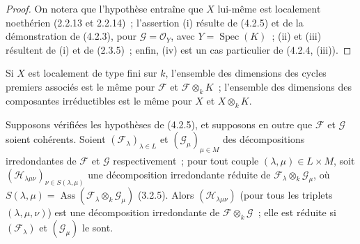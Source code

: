 \begin{proof}
On notera que l'hypothèse entraîne que $X$ lui-même est localement noethérien
(2.2.13 et 2.2.14)~; l'assertion (i) résulte de (4.2.5) et de la démonstration
de (4.2.3), pour $\mathcal G=\mathcal O_Y$, avec
$Y=\operatorname{Spec}(K)$~; (ii) et (iii) résultent de (i) et de (2.3.5)~;
enfin, (iv) est un cas particulier de (4.2.4, (iii)).
\end{proof}

\begin{corollary}[4.2.8]
\label{IV.2.4.2.8-fr}
Si $X$ est localement de type fini sur $k$, l'ensemble des dimensions des
cycles premiers associés est le même pour $\mathcal F$ et
$\mathcal F\otimes_k K$~; l'ensemble des dimensions des composantes
irréductibles est le même pour $X$ et $X\otimes_k K$.
\end{corollary}

\begin{proposition}[4.2.9]
\label{IV.2.4.2.9-fr}
Supposons vérifiées les hypothèses de (4.2.5), et supposons en outre que
$\mathcal F$ et $\mathcal G$ soient cohérents. Soient
$(\mathcal F_\lambda)_{\lambda\in L}$ et
$(\mathcal G_\mu)_{\mu\in M}$ des décompositions irredondantes de
$\mathcal F$ et $\mathcal G$ respectivement~; pour tout couple
$(\lambda,\mu)\in L\times M$, soit
$(\mathcal H_{\lambda\mu\nu})_{\nu\in S(\lambda,\mu)}$ une décomposition
irredondante réduite de $\mathcal F_\lambda\otimes_k\mathcal G_\mu$, où
$S(\lambda,\mu)=\operatorname{Ass}(\mathcal F_\lambda\otimes_k\mathcal G_\mu)$
(3.2.5). Alors $(\mathcal H_{\lambda\mu\nu})$ (pour tous les triplets
$(\lambda,\mu,\nu)$) est une décomposition irredondante de
$\mathcal F\otimes_k\mathcal G$~; elle est réduite si
$(\mathcal F_\lambda)$ et $(\mathcal G_\mu)$ le sont.
\end{proposition}

